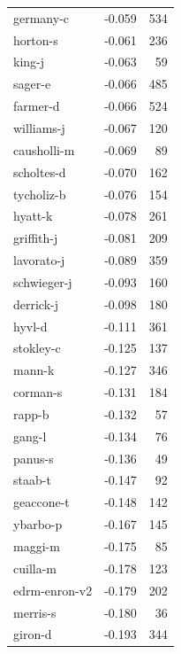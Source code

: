 \documentclass{vldb}
\begin{document}
\begin{appendix}
\begin{supertabular}{ l r r }
germany-c      &                -0.059 &     534 \\
horton-s       &                -0.061 &     236 \\
king-j         &                -0.063 &      59 \\
sager-e        &                -0.066 &     485 \\
farmer-d       &                -0.066 &     524 \\
williams-j     &                -0.067 &     120 \\
causholli-m    &                -0.069 &      89 \\
scholtes-d     &                -0.070 &     162 \\
tycholiz-b     &                -0.076 &     154 \\
hyatt-k        &                -0.078 &     261 \\
griffith-j     &                -0.081 &     209 \\
lavorato-j     &                -0.089 &     359 \\
schwieger-j    &                -0.093 &     160 \\
derrick-j      &                -0.098 &     180 \\
hyvl-d         &                -0.111 &     361 \\
stokley-c      &                -0.125 &     137 \\
mann-k         &                -0.127 &     346 \\
corman-s       &                -0.131 &     184 \\
rapp-b         &                -0.132 &      57 \\
gang-l         &                -0.134 &      76 \\
panus-s        &                -0.136 &      49 \\
staab-t        &                -0.147 &      92 \\
geaccone-t     &                -0.148 &     142 \\
ybarbo-p       &                -0.167 &     145 \\
maggi-m        &                -0.175 &      85 \\
cuilla-m       &                -0.178 &     123 \\
edrm-enron-v2  &                -0.179 &     202 \\
merris-s       &                -0.180 &      36 \\
giron-d        &                -0.193 &     344 \\

\end{supertabular}
\end{appendix}
\end{document}
